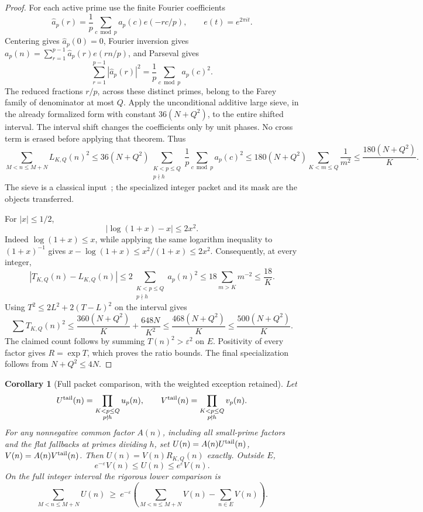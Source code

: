 \documentclass[11pt]{article}
\newtheorem{corollary}[theorem]{Corollary}
\begin{document}
\begin{proof}
For each active prime use the finite Fourier coefficients
\[
 \widehat a_p(r)=\frac1p\sum_{c\bmod p}a_p(c)e(-rc/p),
 \qquad e(t)=e^{2\pi it}.
\]
Centering gives \(\widehat a_p(0)=0\), Fourier inversion gives
\(a_p(n)=\sum_{r=1}^{p-1}\widehat a_p(r)e(rn/p)\), and Parseval gives
\[
 \sum_{r=1}^{p-1}|\widehat a_p(r)|^2
                  =\frac1p\sum_{c\bmod p}a_p(c)^2.
\]
The reduced fractions \(r/p\), across these distinct primes, belong
to the Farey family of denominator at most \(Q\). Apply the
unconditional additive large sieve, in the already formalized form
with constant \(36(N+Q^2)\), to the entire shifted interval.
The interval shift changes the coefficients only by unit phases.
No cross term is erased before applying that theorem. Thus
\[
 \sum_{M<n\leq M+N}L_{K,Q}(n)^2
 \leq36(N+Q^2)
      \sum_{\substack{K<p\leq Q\\p\nmid h}}\frac1p\sum_{c\bmod p}a_p(c)^2
 \leq180(N+Q^2)\sum_{K<m\leq Q}\frac1{m^2}
 \leq\frac{180(N+Q^2)}K.
\]
The sieve is a classical input~\cite{MontgomeryVaughanLargeSieve};
the specialized integer packet and its mask are the objects transferred.

For \(|x|\leq1/2\),
\[
 |\log(1+x)-x|\leq2x^2.
\]
Indeed \(\log(1+x)\leq x\), while applying the same logarithm
inequality to \((1+x)^{-1}\) gives
\(x-\log(1+x)\leq x^2/(1+x)\leq2x^2\).
Consequently, at every integer,
\[
 |T_{K,Q}(n)-L_{K,Q}(n)|
       \leq2\sum_{\substack{K<p\leq Q\\p\nmid h}}a_p(n)^2
       \leq18\sum_{m>K}m^{-2}\leq\frac{18}K.
\]
Using \(T^2\leq2L^2+2(T-L)^2\) on the interval gives
\[
 \sum T_{K,Q}(n)^2
 \leq\frac{360(N+Q^2)}K+\frac{648N}{K^2}
 \leq\frac{468(N+Q^2)}K
 \leq\frac{500(N+Q^2)}K.
\]
The claimed count follows by summing \(T(n)^2>\varepsilon^2\)
on \(E\). Positivity of every factor gives \(R=\exp T\), which
proves the ratio bounds. The final specialization follows from
\(N+Q^2\leq4N\).
\end{proof}

\begin{corollary}[Full packet comparison, with the weighted exception retained]
\label{cor:integerPacketMass}
Let
\[
 U^{\rm tail}(n)=\prod_{\substack{K<p\leq Q\\p\nmid h}}u_p(n),
 \qquad
 V^{\rm tail}(n)=\prod_{\substack{K<p\leq Q\\p\nmid h}}v_p(n).
\]
For any nonnegative common factor \(A(n)\), including all small-prime
factors and the flat fallbacks at primes dividing \(h\), set
\(U(n)=A(n)U^{\rm tail}(n)\), \(V(n)=A(n)V^{\rm tail}(n)\).
Then \(U(n)=V(n)R_{K,Q}(n)\) exactly. Outside \(E\),
\[
                  e^{-\varepsilon}V(n)\leq U(n)\leq e^\varepsilon V(n).
\]
On the full integer interval the rigorous lower comparison is
\[
 \sum_{M<n\leq M+N}U(n)\ \geq\
 e^{-\varepsilon}\left(
       \sum_{M<n\leq M+N}V(n)-\sum_{n\in E}V(n)\right).
\]
\end{corollary}
\end{document}
